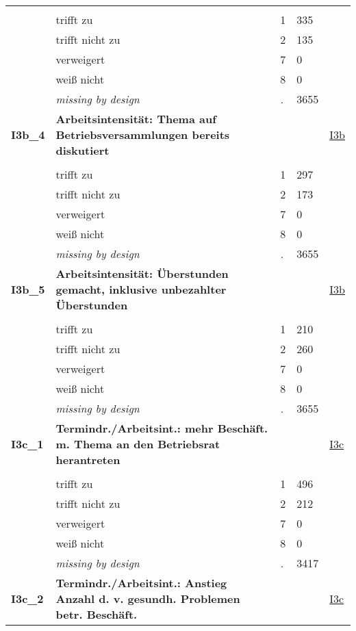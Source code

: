 \begin{longtable}{| L{2.65cm} | L{8cm} | C{1.5cm} | R{1.25cm} | C{2.25cm}  |}
   &  &  &  &  \\ 
   & trifft zu & 1 & 335 &  \\ 
   & trifft nicht zu & 2 & 135 &  \\ 
   & verweigert & 7 & 0 &  \\ 
   & weiß nicht & 8 & 0 &  \\ 
   & \textit{missing by design} & \textit{.} & 3655 &  \\ 
   \midrule
\textbf{I3b\_4}\label{var:I3b:4} & \textbf{Arbeitsintensität: Thema auf Betriebsversammlungen bereits diskutiert} &  &  & \hyperref[I3b]{I3b} \\ 
   &  &  &  &  \\ 
   & trifft zu & 1 & 297 &  \\ 
   & trifft nicht zu & 2 & 173 &  \\ 
   & verweigert & 7 & 0 &  \\ 
   & weiß nicht & 8 & 0 &  \\ 
   & \textit{missing by design} & \textit{.} & 3655 &  \\ 
   \midrule
\textbf{I3b\_5}\label{var:I3b:5} & \textbf{Arbeitsintensität: Überstunden gemacht, inklusive unbezahlter Überstunden} &  &  & \hyperref[I3b]{I3b} \\ 
   &  &  &  &  \\ 
   & trifft zu & 1 & 210 &  \\ 
   & trifft nicht zu & 2 & 260 &  \\ 
   & verweigert & 7 & 0 &  \\ 
   & weiß nicht & 8 & 0 &  \\ 
   & \textit{missing by design} & \textit{.} & 3655 &  \\ 
   \midrule
\textbf{I3c\_1}\label{var:I3c:1} & \textbf{Termindr./Arbeitsint.: mehr Beschäft. m. Thema an den Betriebsrat herantreten} &  &  & \hyperref[I3c]{I3c} \\ 
   &  &  &  &  \\ 
   & trifft zu & 1 & 496 &  \\ 
   & trifft nicht zu & 2 & 212 &  \\ 
   & verweigert & 7 & 0 &  \\ 
   & weiß nicht & 8 & 0 &  \\ 
   & \textit{missing by design} & \textit{.} & 3417 &  \\ 
   \midrule
\textbf{I3c\_2}\label{var:I3c:2} & \textbf{Termindr./Arbeitsint.: Anstieg Anzahl d. v. gesundh. Problemen betr. Beschäft.} &  &  & \hyperref[I3c]{I3c} \\ 

\end{longtable}
